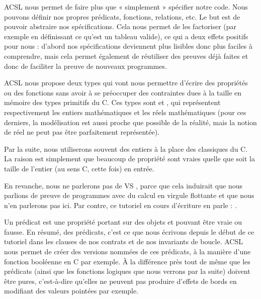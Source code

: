 \documentclass[middle]{zmdocument}
\begin{document}
ACSL nous permet de faire plus que « simplement » spécifier notre code. Nous 
pouvons définir nos propres prédicats, fonctions, relations, etc. Le but est de
pouvoir abstraire nos spécifications. Cela nous permet de les factoriser (par 
exemple en définissant ce qu'est un tableau valide), ce qui a deux effets 
positifs pour nous : d'abord nos spécifications deviennent plus lisibles donc 
plus faciles à comprendre, mais cela permet également de réutiliser des preuves
déjà faites et donc de faciliter la preuve de nouveaux programmes.





ACSL nous propose deux types qui vont nous permettre d'écrire des propriétés 
ou des fonctions sans avoir à se préoccuper des contraintes dues à la taille en
mémoire des types primitifs du C. Ces types sont  et ,
qui représentent respectivement les entiers mathématiques et les réels 
mathématiques (pour ces derniers, la modélisation est aussi proche que possible 
de la réalité, mais la notion de réel ne peut pas être parfaitement représentée).



Par la suite, nous utiliserons souvent des entiers à la place des classiques 
 du C. La raison est simplement que beaucoup de propriété sont vraies 
quelle que soit la taille de l'entier (au sens C, cette fois) en entrée.



En revanche, nous ne parlerons pas de  VS , parce que 
cela induirait que nous parlions de preuve de programmes avec du calcul en virgule 
flottante et que nous n'en parlerons pas ici. Par contre, ce tutoriel en cours d'écriture en parle : .





Un prédicat est une propriété portant sur des objets et pouvant être vraie ou 
fausse. En résumé, des prédicats, c'est ce que nous écrivons depuis le début de
ce tutoriel dans les clauses de nos contrats et de nos invariants de boucle. 
ACSL nous permet de créer des versions nommées de ces prédicats, à la manière 
d'une fonction booléenne en C par exemple. À la différence près tout de même que
les prédicats (ainsi que les fonctions logiques que nous verrons par la suite) 
doivent être pures, c'est-à-dire qu'elles ne peuvent pas produire d'effets de 
bords en modifiant des valeurs pointées par exemple.
\end{document}

